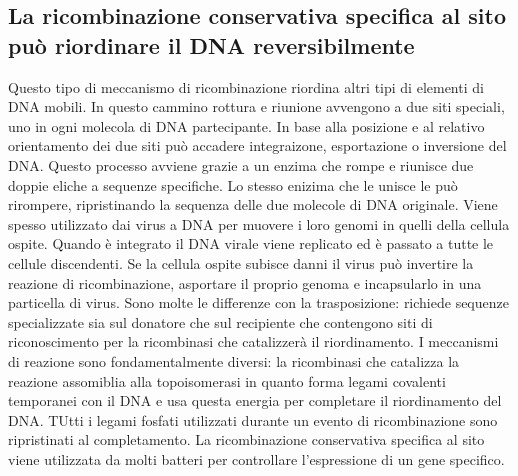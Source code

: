\subsection{La ricombinazione conservativa specifica al sito pu\`o riordinare il DNA reversibilmente}
Questo tipo di meccanismo di ricombinazione riordina altri tipi di elementi di DNA mobili. In questo cammino rottura e riunione avvengono a due siti speciali, uno in ogni molecola di DNA
partecipante. In base alla posizione e al relativo orientamento dei due siti pu\`o accadere integraizone, esportazione o inversione del DNA. Questo processo avviene grazie a un enzima 
che rompe e riunisce due doppie eliche a sequenze specifiche. Lo stesso enizima che le unisce le pu\`o rirompere, ripristinando la sequenza delle due molecole di DNA originale. Viene
spesso utilizzato dai virus a DNA per muovere i loro genomi in quelli della cellula ospite. Quando \`e integrato il DNA virale viene replicato ed \`e passato a tutte le cellule 
discendenti. Se la cellula ospite subisce danni il virus pu\`o invertire la reazione di ricombinazione, asportare il proprio genoma e incapsularlo in una particella di virus. Sono
molte le differenze con la trasposizione: richiede sequenze specializzate sia sul donatore che sul recipiente che contengono siti di riconoscimento per la ricombinasi che catalizzer\`a
il riordinamento. I meccanismi di reazione sono fondamentalmente diversi: la ricombinasi che catalizza la reazione assomiblia alla topoisomerasi in quanto forma legami covalenti 
temporanei con il DNA e usa questa energia per completare il riordinamento del DNA. TUtti i legami fosfati utilizzati durante un evento di ricombinazione sono ripristinati al 
completamento. La ricombinazione conservativa specifica al sito viene utilizzata da molti batteri per controllare l'espressione di un gene specifico.
